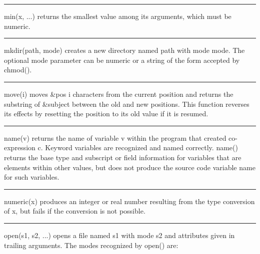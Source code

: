 \bigskip\hrule\vspace{0.1cm}

\noindent
{}\textsf{min(x, ...)} returns the smallest value among its
arguments, which must be numeric.

\bigskip\hrule\vspace{0.1cm}

\noindent
{}\textsf{mkdir(path,
mode)} creates a new directory named \textsf{path} with mode
\textsf{mode}. The optional \textsf{mode} parameter can be numeric or a
string of the form accepted by \textsf{chmod()}.

\bigskip\hrule\vspace{0.1cm}

\noindent
{}\textsf{move(i)} moves \textsf{\&pos} \textsf{i}
characters from the current position and returns the substring of
\textsf{\&subject} between the old and new positions. This function
reverses its effects by resetting the position to its old value if it
is resumed.

\bigskip\hrule\vspace{0.1cm}

\noindent
{}\textsf{name(v)} returns the name of variable \textsf{v}
within the program that created co-expression \textsf{c}. Keyword
variables are recognized and named correctly. \textsf{name()} returns
the base type and subscript or field information for variables that are
elements within other values, but does not produce the source code
variable name for such variables. 

\bigskip\hrule\vspace{0.1cm}

\noindent
{}\textsf{numeric(x)} produces an integer or real
number resulting from the type conversion of \textsf{x}, but fails if
the conversion is not possible.

\bigskip\hrule\vspace{0.1cm}

\noindent
{}\textsf{open(s1, s2, ...)} opens a file named
\textsf{s1} with mode \textsf{s2} and attributes given in trailing
arguments. The modes recognized by \textsf{open()} are: 

